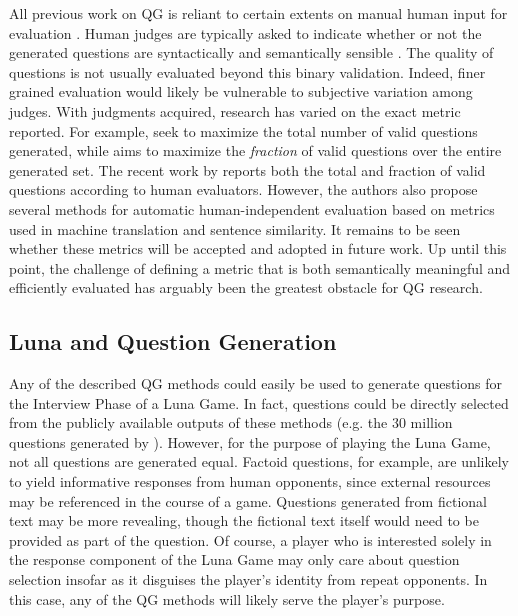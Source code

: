 All previous work on QG is reliant to certain extents on manual human input for evaluation \citep{rus2011question, heilman2011automatic, 1603.06807}. Human judges are typically asked to indicate whether or not the generated questions are syntactically and semantically sensible \citep{rus2011question}. The quality of questions is not usually evaluated beyond this binary validation. Indeed, finer grained evaluation would likely be vulnerable to subjective variation among judges. With judgments acquired, research has varied on the exact metric reported. For example,  \citet{ali2010automatic} seek to maximize the total number of valid questions generated, while \citet{heilman2011automatic} aims to maximize the \textit{fraction} of valid questions over the entire generated set. The recent work by \citet{1603.06807} reports both the total and fraction of valid questions according to human evaluators. However, the authors also propose several methods for automatic human-independent evaluation based on metrics used in machine translation and sentence similarity.  It remains to be seen whether these metrics will be accepted and adopted in future work. Up until this point, the challenge of defining a metric that is both semantically meaningful and efficiently evaluated has arguably been the greatest obstacle for QG research.

\subsection{Luna and Question Generation}

Any of the described QG methods could easily be used to generate questions for the Interview Phase of a Luna Game. In fact, questions could be directly selected from the publicly available outputs of these methods (e.g. the 30 million questions generated by \citet{1603.06807}). However, for the purpose of playing the Luna Game, not all questions are generated equal. Factoid questions, for example, are unlikely to yield informative responses from human opponents, since external resources may be referenced in the course of a game. Questions generated from fictional text may be more revealing, though the fictional text itself would need to be provided as part of the question. Of course, a player who is interested solely in the response component of the Luna Game may only care about question selection insofar as it disguises the player's identity from repeat opponents. In this case, any of the QG methods will likely serve the player's purpose.

